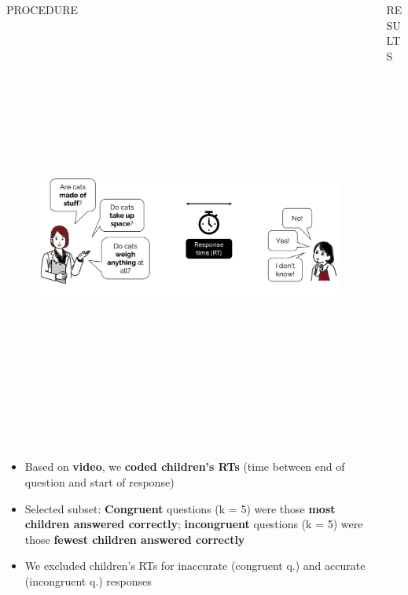 \documentclass[final]{beamer}
\newlength{\colwidth}
\newlength{\widecolwidth}
\begin{document}
\begin{frame}[t]
\begin{columns}[t]
\begin{column}{\colwidth}
\begin{block}{PROCEDURE}
    \begin{figure}
      \centering
	{\includegraphics[height=14cm]{images/procedure6.png}}\\[-1ex]
    \end{figure}

    \begin{itemize}
	\item Based on \textbf{video}, we \textbf{coded children's RTs} (time between end of question and start of response)
	\item Selected subset: \textbf{Congruent} questions (k = 5) were those \textbf{most children answered correctly}; \textbf{incongruent} questions (k = 5) were those \textbf{fewest children answered correctly}
	\item We excluded children's RTs for inaccurate (congruent q.) and accurate (incongruent q.) responses
    \end{itemize}
    
  \end{block}

\end{column}

\begin{column}{\widecolwidth}

  \begin{block}{RESULTS}


\end{block}
\end{column}
\end{columns}
\end{frame}
\end{document}
